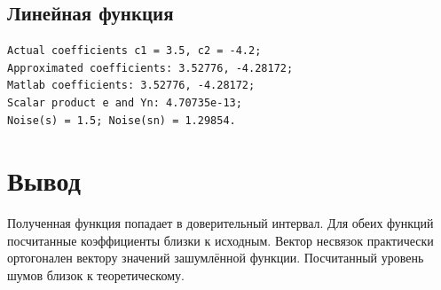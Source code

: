 \documentclass{article}
\begin{document}
    \subsection{Линейная функция}
        \begin{verbatim}
Actual coefficients c1 = 3.5, c2 = -4.2;
Approximated coefficients: 3.52776, -4.28172;
Matlab coefficients: 3.52776, -4.28172;
Scalar product e and Yn: 4.70735e-13;
Noise(s) = 1.5; Noise(sn) = 1.29854.
        \end{verbatim}
        \begin{figure}[h]
        \end{figure} 
    \section{Вывод}
        Полученная функция попадает в доверительный интервал. Для обеих функций посчитанные коэффициенты близки к исходным. Вектор несвязок практически ортогонален вектору значений зашумлённой функции. Посчитанный уровень шумов близок к теоретическому.
\end{document}
